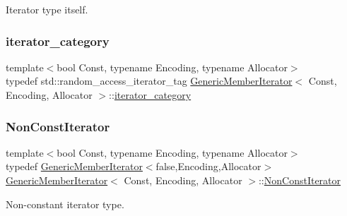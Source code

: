 Iterator type itself. 

\mbox{\label{classGenericMemberIterator_a36cd90aef13c0cce916929f63fdb5c86}} 
\subsubsection{\texorpdfstring{iterator\+\_\+category}{iterator\_category}}
{\footnotesize\ttfamily template$<$bool Const, typename Encoding, typename Allocator$>$ \\
typedef std\+::random\+\_\+access\+\_\+iterator\+\_\+tag \hyperlink{classGenericMemberIterator}{Generic\+Member\+Iterator}$<$ Const, Encoding, Allocator $>$\+::\hyperlink{classGenericMemberIterator_a36cd90aef13c0cce916929f63fdb5c86}{iterator\+\_\+category}}

\mbox{\label{classGenericMemberIterator_abc26eb06f2962765b11dcd06ce84ac02}} 
\subsubsection{\texorpdfstring{Non\+Const\+Iterator}{NonConstIterator}}
{\footnotesize\ttfamily template$<$bool Const, typename Encoding, typename Allocator$>$ \\
typedef \hyperlink{classGenericMemberIterator}{Generic\+Member\+Iterator}$<$false,Encoding,Allocator$>$ \hyperlink{classGenericMemberIterator}{Generic\+Member\+Iterator}$<$ Const, Encoding, Allocator $>$\+::\hyperlink{classGenericMemberIterator_abc26eb06f2962765b11dcd06ce84ac02}{Non\+Const\+Iterator}}



Non-\/constant iterator type. 

\mbox{\label{classGenericMemberIterator_ac0d50d12ba074e68837964244668c66b}} 
